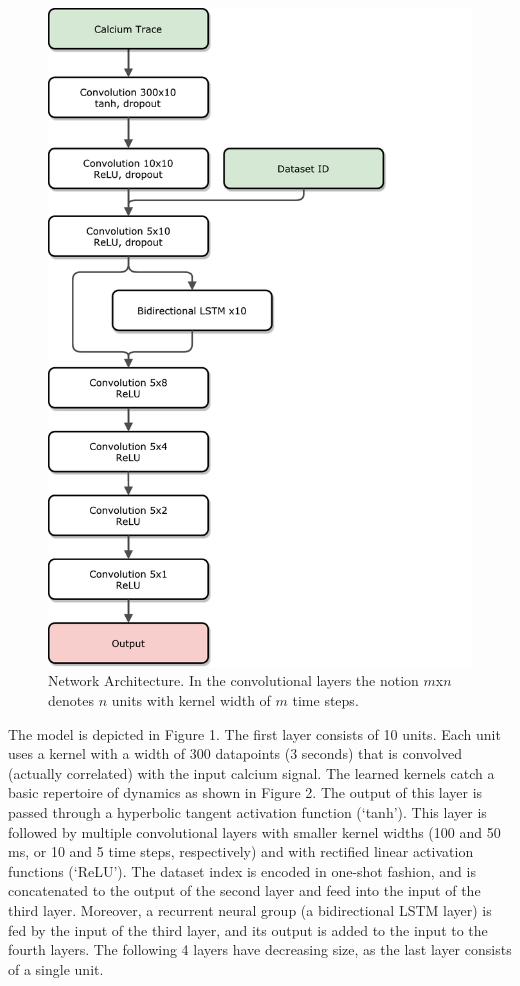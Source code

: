 \documentclass{article}
\begin{document}
\begin{figure}
  \centering
  \includegraphics[height=0.9\textheight]{convi}
  \caption{Network Architecture. In the convolutional layers the notion $m$x$n$ denotes $n$ units with
  kernel width of $m$ time steps. }

\end{figure}

The model is depicted in Figure 1.
The first layer consists of 10 units. Each unit uses a kernel with a width of
300 datapoints (3 seconds) that is convolved (actually correlated) with the
input calcium signal. The learned kernels catch a basic repertoire of dynamics
as shown in Figure 2. The output of this layer is passed through a hyperbolic tangent 
activation function (`tanh'). This layer is followed by multiple convolutional layers
with smaller kernel widths (100 and 50 ms, or 10 and 5 time steps, respectively) and with rectified linear activation
functions (`ReLU'). The dataset index is encoded in one-shot fashion, and is
concatenated to the output of the second layer and feed into the input of the third
layer. Moreover, a recurrent neural group (a bidirectional LSTM layer) is fed by the
input of the third layer, and its output is added to the input to the fourth layers.
The following 4 layers have decreasing size, as the last layer consists of a single unit.
\end{document}
